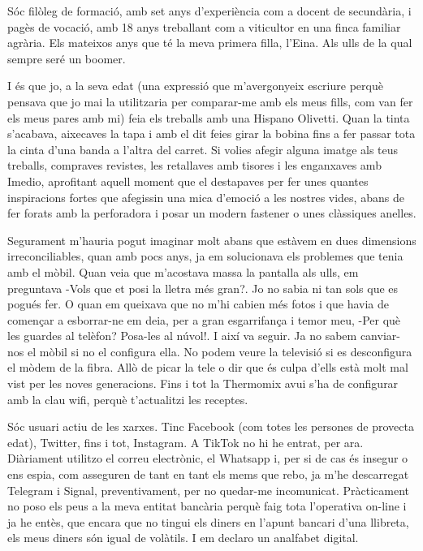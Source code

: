 

Sóc filòleg de formació, amb set anys d'experiència com a docent de secundària, i pagès de vocació, amb 18 anys treballant com a viticultor en una finca familiar agrària. Els mateixos anys que té la meva primera filla, l'Eina. Als ulls de la qual sempre seré un boomer.

I és que jo, a la seva edat (una expressió que m'avergonyeix escriure perquè pensava que jo mai la utilitzaria per comparar-me amb els meus fills, com van fer els meus pares amb mi) feia els treballs amb una Hispano Olivetti. Quan la tinta s'acabava, aixecaves la tapa i amb el dit feies girar la bobina fins a fer passar tota la cinta d'una banda a l'altra del carret. Si volies afegir alguna imatge als teus treballs, compraves revistes, les retallaves amb tisores i les enganxaves amb Imedio, aprofitant aquell moment que el destapaves per fer unes quantes inspiracions fortes que afegissin una mica d'emoció a les nostres vides, abans de fer forats amb la perforadora i posar un modern fastener o unes clàssiques anelles.

Segurament m'hauria pogut imaginar molt abans que estàvem en dues dimensions irreconciliables, quan amb pocs anys, ja em solucionava els problemes que tenia amb el mòbil. Quan veia que m'acostava massa la pantalla als ulls, em preguntava -Vols que et posi la lletra més gran?. Jo no sabia ni tan sols que es pogués fer. O quan em queixava que no m'hi cabien més fotos i que havia de començar a esborrar-ne em deia, per a gran esgarrifança i temor meu, -Per què les guardes al telèfon? Posa-les al núvol!. I així va seguir. Ja no sabem canviar-nos el mòbil si no el configura ella. No podem veure la televisió si es desconfigura el mòdem de la fibra. Allò de picar la tele o dir que és culpa d'ells està molt mal vist per les noves generacions. Fins i tot la Thermomix avui s'ha de configurar amb la clau wifi, perquè t'actualitzi les receptes.

Sóc usuari actiu de les xarxes. Tinc Facebook (com totes les persones de provecta edat), Twitter, fins i tot, Instagram. A TikTok no hi he entrat, per ara. Diàriament utilitzo el correu electrònic, el Whatsapp i, per si de cas és insegur o ens espia, com asseguren de tant en tant els mems que rebo, ja m'he descarregat Telegram i Signal, preventivament, per no quedar-me incomunicat. Pràcticament no poso els peus a la meva entitat bancària perquè faig tota l'operativa on-line i ja he entès, que encara que no tingui els diners en l'apunt bancari d'una llibreta, els meus diners són igual de volàtils. I em declaro un analfabet digital.

